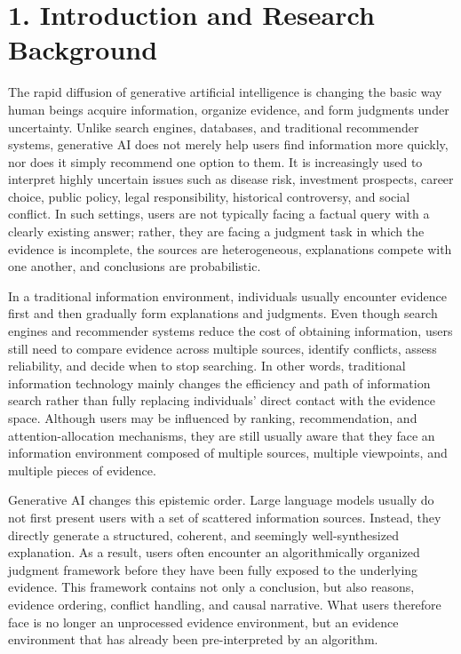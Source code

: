 \section*{1. Introduction and Research Background}

The rapid diffusion of generative artificial intelligence is changing the basic way human beings acquire information, organize evidence, and form judgments under uncertainty. Unlike search engines, databases, and traditional recommender systems, generative AI does not merely help users find information more quickly, nor does it simply recommend one option to them. It is increasingly used to interpret highly uncertain issues such as disease risk, investment prospects, career choice, public policy, legal responsibility, historical controversy, and social conflict. In such settings, users are not typically facing a factual query with a clearly existing answer; rather, they are facing a judgment task in which the evidence is incomplete, the sources are heterogeneous, explanations compete with one another, and conclusions are probabilistic.

In a traditional information environment, individuals usually encounter evidence first and then gradually form explanations and judgments. Even though search engines and recommender systems reduce the cost of obtaining information, users still need to compare evidence across multiple sources, identify conflicts, assess reliability, and decide when to stop searching. In other words, traditional information technology mainly changes the efficiency and path of information search rather than fully replacing individuals' direct contact with the evidence space. Although users may be influenced by ranking, recommendation, and attention-allocation mechanisms, they are still usually aware that they face an information environment composed of multiple sources, multiple viewpoints, and multiple pieces of evidence.

Generative AI changes this epistemic order. Large language models usually do not first present users with a set of scattered information sources. Instead, they directly generate a structured, coherent, and seemingly well-synthesized explanation. As a result, users often encounter an algorithmically organized judgment framework before they have been fully exposed to the underlying evidence. This framework contains not only a conclusion, but also reasons, evidence ordering, conflict handling, and causal narrative. What users therefore face is no longer an unprocessed evidence environment, but an evidence environment that has already been pre-interpreted by an algorithm.

